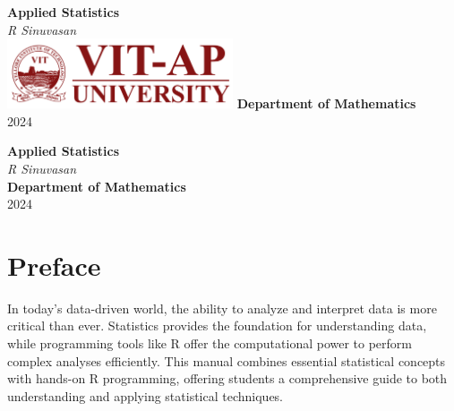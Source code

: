 \documentclass[10pt]{book}
\begin{document}


\begin{titlepage}
    \centering
    \vspace*{1in}
    {\Huge\bfseries\color{chaptercolor} Applied Statistics}\\
    \vspace{0.5in}
    {\Large\textit{R Sinuvasan}}\\
    \vfill
    \includegraphics[width=0.5\textwidth]{VIT-AP LOGO} %
    \vfill
    {\Large\textbf{Department of Mathematics}}\\
    \vspace{0.2in}
    {\Large 2024}
\end{titlepage}

\newpage
\thispagestyle{empty}
\begin{center}
    \vspace*{1in}
    {\Huge\bfseries\color{chaptercolor} Applied Statistics}\\
    \vspace{0.5in}
    {\Large\textit{R Sinuvasan}}\\
    \vfill
    {\Large\textbf{Department of Mathematics}}\\
    \vspace{0.2in}
    {\Large 2024}
\end{center}
\newpage

\chapter*{Preface}

In today’s data-driven world, the ability to analyze and interpret data is more critical than ever. Statistics provides the foundation for understanding data, while programming tools like R offer the computational power to perform complex analyses efficiently. This manual combines essential statistical concepts with hands-on R programming, offering students a comprehensive guide to both understanding and applying statistical techniques.
\end{document}

